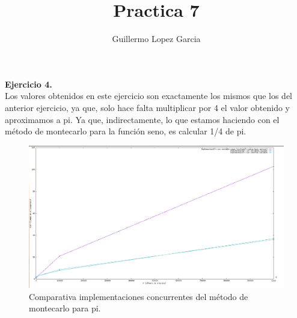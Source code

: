 \documentclass[]{article}
\title{Practica 7}
\author{Guillermo Lopez Garcia}
\begin{document}
\maketitle

\textbf{Ejercicio 4.} \\

Los valores obtenidos en este ejercicio son exactamente los mismos
que los del anterior ejercicio, ya que, solo hace falta multiplicar
por 4 el valor obtenido y aproximamos a pi. Ya que, indirectamente,
lo que estamos haciendo con el método de montecarlo para la
función seno, es calcular 1/4 de pi. \\

\begin{figure}
\includegraphics[width=\linewidth]{img.png}
\caption{Comparativa implementaciones concurrentes del método de montecarlo para pi.}
\label{fig:comp}
\end{figure}
\end{document}
